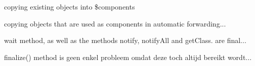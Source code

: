 \documentclass[a4paper,12pt]{book}
\begin{document}
copying existing objects into \$components

copying objects that are used as components in automatic forwarding...

 wait method, as well as the methods notify, notifyAll  and getClass. are final...
 
 
finalize() method is geen enkel probleem omdat deze toch altijd bereikt wordt...









\end{document}
